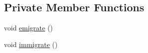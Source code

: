 \subsection*{Private Member Functions}
\begin{CompactItemize}
\item 
\hypertarget{classpeoAsyncIslandMig_87a4ef7d4bd30d349a801bf0f9e87c82}{
void \hyperlink{classpeoAsyncIslandMig_87a4ef7d4bd30d349a801bf0f9e87c82}{emigrate} ()}
\label{classpeoAsyncIslandMig_87a4ef7d4bd30d349a801bf0f9e87c82}

\item 
\hypertarget{classpeoAsyncIslandMig_5a9a64ba51a696e45f91b362c39c9a64}{
void \hyperlink{classpeoAsyncIslandMig_5a9a64ba51a696e45f91b362c39c9a64}{immigrate} ()}
\label{classpeoAsyncIslandMig_5a9a64ba51a696e45f91b362c39c9a64}

\end{CompactItemize}
